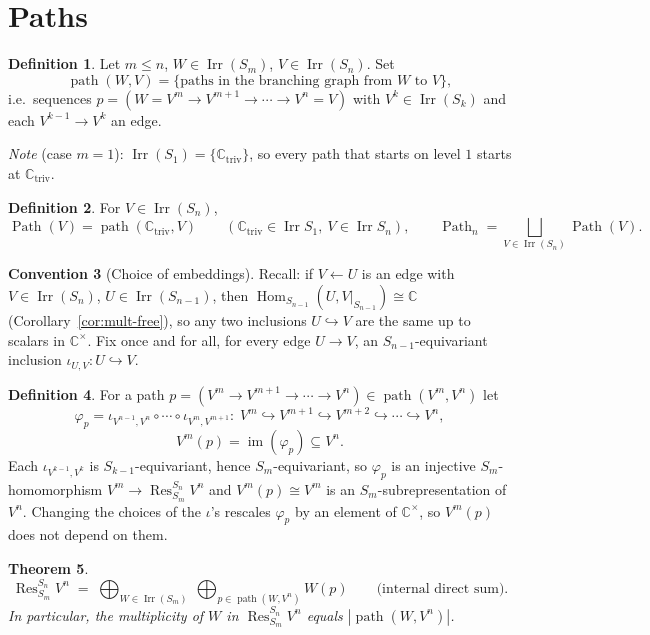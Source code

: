 \documentclass[11pt]{article}
\newtheorem{theorem}{Theorem}[section]
\theoremstyle{definition}
\newtheorem{definition}[theorem]{Definition}
\newtheorem{convention}[theorem]{Convention}
\theoremstyle{remark}
\newcommand{\C}{\mathbb{C}}
\DeclareMathOperator{\Irr}{Irr}
\DeclareMathOperator{\Res}{Res}
\DeclareMathOperator{\Hom}{Hom}
\DeclareMathOperator{\im}{im}
\DeclareMathOperator{\pth}{path}   %
\DeclareMathOperator{\Pth}{Path}   %
\newcommand{\Ctriv}{\C_{\mathrm{triv}}}
\newcommand{\into}{\hookrightarrow}
\begin{document}
\section{Paths}

\begin{definition}
Let $m\le n$, $W\in\Irr(S_m)$, $V\in\Irr(S_n)$. Set
\[
  \pth(W,V)=\{\text{paths in the branching graph from $W$ to $V$}\},
\]
i.e.\ sequences $p=(W=V^m\to V^{m+1}\to\cdots\to V^n=V)$ with
$V^k\in\Irr(S_k)$ and each $V^{k-1}\to V^k$ an edge.
\end{definition}

\noindent\emph{Note} (case $m=1$): $\Irr(S_1)=\{\Ctriv\}$, so every path that
starts on level $1$ starts at $\Ctriv$.

\begin{definition}
For $V\in\Irr(S_n)$,
\[
  \Pth(V)=\pth(\Ctriv,V)\qquad(\Ctriv\in\Irr S_1,\ V\in\Irr S_n),
  \qquad
  \Pth_n=\bigsqcup_{V\in\Irr(S_n)}\Pth(V).
\]
\end{definition}

\begin{convention}[Choice of embeddings]
Recall: if $V\leftarrow U$ is an edge with $V\in\Irr(S_n)$,
$U\in\Irr(S_{n-1})$, then
$\Hom_{S_{n-1}}(U,V|_{S_{n-1}})\cong\C$ (Corollary~\ref{cor:mult-free}), so
any two inclusions $U\into V$ are the same up to scalars in $\C^\times$. Fix
once and for all, for every edge $U\to V$, an $S_{n-1}$-equivariant inclusion
$\iota_{U,V}\colon U\into V$.
\end{convention}

\begin{definition}
For a path $p=(V^m\to V^{m+1}\to\cdots\to V^n)\in\pth(V^m,V^n)$ let
\[
  \varphi_p=\iota_{V^{n-1},V^n}\circ\cdots\circ\iota_{V^m,V^{m+1}}
  \colon\;
  V^m\into V^{m+1}\into V^{m+2}\into\cdots\into V^n ,
\]
\[
  V^m(p)=\im(\varphi_p)\subseteq V^n .
\]
Each $\iota_{V^{k-1},V^k}$ is $S_{k-1}$-equivariant, hence
$S_m$-equivariant, so $\varphi_p$ is an injective $S_m$-homomorphism
$V^m\to\Res^{S_n}_{S_m}V^n$ and $V^m(p)\cong V^m$ is an $S_m$-subrepresentation
of $V^n$. Changing the choices of the $\iota$'s rescales $\varphi_p$ by an
element of $\C^\times$, so $V^m(p)$ does not depend on them.
\end{definition}

\begin{theorem}\label{thm:res}
\[
  \Res^{S_n}_{S_m}V^n \;=\;
  \bigoplus_{W\in\Irr(S_m)}\ \bigoplus_{p\in\pth(W,V^n)} W(p)
  \qquad\text{(internal direct sum).}
\]
In particular, the multiplicity of $W$ in $\Res^{S_n}_{S_m}V^n$ equals
$|\pth(W,V^n)|$.
\end{theorem}
\end{document}
